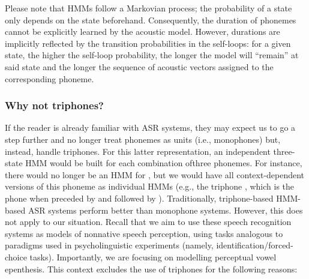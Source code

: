 Please note that HMMs follow a Markovian process; the probability of a state only depends on the state beforehand. Consequently, the duration of phonemes cannot be explicitly learned by the acoustic model. However, durations are implicitly reflected by the transition probabilities in the self-loops: for a given state, the higher the self-loop probability, the longer the model will ``remain'' at said state and the longer the sequence of acoustic vectors assigned to the corresponding phoneme.     

\subsubsection{Why not triphones?}
If the reader is already familiar with ASR systems, they may expect us to go a step further and no longer treat phonemes as units (i.e., monophones) but, instead, handle triphones. For this latter representation, an independent three-state HMM would be built for each combination ofthree phonemes. For instance, there would no longer be an HMM for , but we would have all context-dependent versions of this phoneme as individual HMMs (e.g., the triphone , which is the phone  when preceded by  and followed by ).
Traditionally, triphone-based HMM-based ASR systems perform better than monophone systems. However, this does not apply to our situation. Recall that we aim to use these speech recognition systems as models of nonnative speech perception, using tasks analogous to paradigms used in psycholinguistic experiments (namely, identification/forced-choice tasks). Importantly, we are focusing on modelling perceptual vowel epenthesis. This context excludes the use of triphones for the following reasons:

